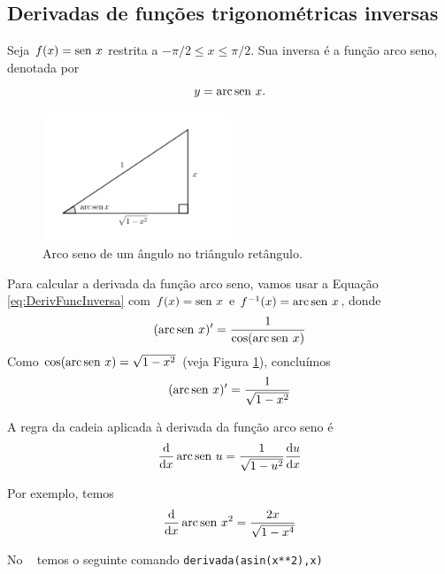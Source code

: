 \cleardoublepage\documentclass[../main.tex]{subfiles}
\begin{document}
\subsection{Derivadas de funções trigonométricas inversas}

Seja $f(x) = \operatorname{sen}\, x$ restrita a $-\pi/2 \leq x \leq \pi/2$. Sua inversa é a função arco seno, denotada por
\begin{equation}
  y = \operatorname{arc}\operatorname{sen}\, x.
\end{equation}

\begin{figure}[H]
  \centering
  \includegraphics[width=0.5\textwidth]{fig_deriv/fig_diff_arc_sen}
  \caption{Arco seno de um ângulo no triângulo retângulo.}
  \label{fig:diff_arc_sen}
\end{figure}

Para calcular a derivada da função arco seno, vamos usar a Equação \ref{eq:DerivFuncInversa} com $f(x)=\operatorname{sen}\, x$ e $f^{-1}(x) = \operatorname{arc}\operatorname{sen}\, x$, donde
\begin{equation}
  (\operatorname{arc}\operatorname{sen}\, x)' = \frac{1}{\cos(\operatorname{arc}\operatorname{sen}\, x)}
\end{equation}
Como $\cos(\operatorname{arc}\operatorname{sen}\, x) = \sqrt{1-x^2}$ (veja Figura \ref{fig:diff_arc_sen}), concluímos
\begin{equation}
  (\operatorname{arc}\operatorname{sen}\, x)' = \frac{1}{\sqrt{1-x^2}}
\end{equation}


\begin{ex}
  A regra da cadeia aplicada à derivada da função arco seno é
  \begin{equation}
    \frac{\mathrm{d}}{\mathrm{d} x}\operatorname{arc}\operatorname{sen}\, u = \frac{1}{\sqrt{1-u^2}}\frac{\mathrm{d} u}{\mathrm{d} x}
  \end{equation}

  Por exemplo, temos
  \begin{equation}
    \frac{\mathrm{d}}{\mathrm{d} x}\operatorname{arc}\operatorname{sen}\, x^2 = \frac{2x}{\sqrt{1-x^4}}
  \end{equation}

  
  No \geogebra~ temos o seguinte comando \verb=derivada(asin(x**2),x)=
\end{ex}
\end{document}
